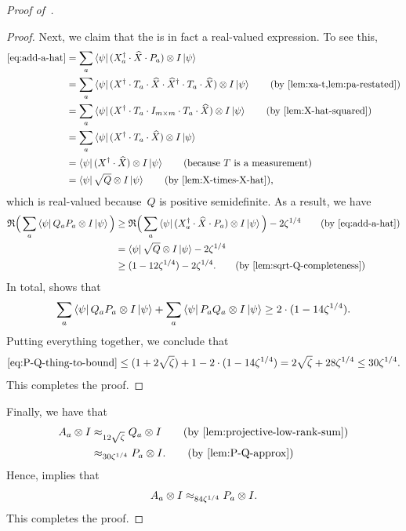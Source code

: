 \begin{proof}[Proof of~]
\begin{proof}
Next, we claim that the  is in fact a real-valued expression.
To see this,
\begin{align*}
\eqref{eq:add-a-hat}
& = \sum_a \bra{\psi} (X_a^\dagger \cdot \widehat{X} \cdot P_a)  \otimes I \ket{\psi}\\
&= \sum_a \bra{\psi} (X^\dagger \cdot T_a \cdot \widehat{X} \cdot \widehat{X}^\dagger \cdot T_a \cdot \widehat{X}) \ot I \ket{\psi}
			\tag{by \Cref{lem:xa-t,lem:pa-restated}}\\
&= \sum_a \bra{\psi} (X^\dagger \cdot T_a \cdot I_{m \times m} \cdot T_a \cdot \widehat{X}) \ot I \ket{\psi} \tag{by \Cref{lem:X-hat-squared}}\\
&= \sum_a \bra{\psi} (X^\dagger \cdot T_a  \cdot \widehat{X}) \ot I \ket{\psi}\\
&=  \bra{\psi} (X^\dagger  \cdot \widehat{X}) \ot I \ket{\psi} \tag{because~$T$ is a measurement}\\
&=  \bra{\psi} \sqrt{Q} \ot I \ket{\psi} \tag{by \Cref{lem:X-times-X-hat}},
\end{align*}
which is real-valued because~$Q$ is positive semidefinite.
As a result, we have
\begin{align*}
\mathfrak{R}\Big(\sum_a \bra{\psi} Q_a P_a \otimes I \ket{\psi}\Big)
& \geq \mathfrak{R}\Big(\sum_a \bra{\psi} (X_a^\dagger \cdot \widehat{X} \cdot P_a)  \otimes I \ket{\psi}\Big) - 2\zeta^{1/4} \tag{by \Cref{eq:add-a-hat}}\\
& = \bra{\psi} \sqrt{Q} \ot I \ket{\psi}- 2\zeta^{1/4}\\
& \geq (1 - 12 \zeta^{1/4}) - 2\zeta^{1/4}. \tag{by \Cref{lem:sqrt-Q-completeness}}
\end{align*}
In total,  shows that
\begin{equation*}
\sum_a \bra{\psi} Q_a P_a \otimes I \ket{\psi}
	+ \sum_a \bra{\psi} P_a Q_a \otimes I \ket{\psi}
\geq 2 \cdot(1 - 14\zeta^{1/4}).
\end{equation*}
Putting everything together, we conclude that
\begin{equation*}
\eqref{eq:P-Q-thing-to-bound}
\leq (1 + 2\sqrt{\zeta}) + 1 - 2\cdot (1-14\zeta^{1/4}) 
= 2\sqrt{\zeta} + 28 \zeta^{1/4}
\leq 30 \zeta^{1/4}.
\end{equation*}
This completes the proof.
\end{proof}

Finally, we have that
\begin{align*}
A_a \ot I
&\approx_{12 \sqrt{\zeta}} Q_a \ot I \tag{by \Cref{lem:projective-low-rank-sum}}\\
&\approx_{30 \zeta^{1/4}} P_a \ot I. \tag{by \Cref{lem:P-Q-approx}}
\end{align*}
Hence,  implies that
\begin{equation*}
A_a \otimes I \approx_{84 \zeta^{1/4}} P_a \otimes I.
\end{equation*}
This completes the proof.
\end{proof}
